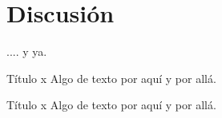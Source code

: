 \documentclass{beamer}
\begin{document}
\section{Discusión}
\begin{frame}{}
	.... y ya.
\end{frame}
\begin{frame}{Título x}
	Algo de texto por aquí y por allá.
\end{frame}
\begin{frame}{Título x}
	Algo de texto por aquí y por allá.
\end{frame}
\end{document}
